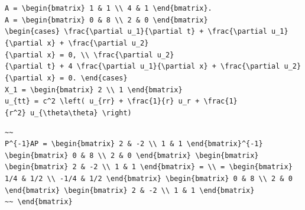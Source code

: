 \documentclass[
  ukrainian,
]{article}
\begin{document}
\texttt{A\ =\ \textbackslash{}begin\{bmatrix\}\ 1\ \&\ 1\ \textbackslash{}\textbackslash{}\ 4\ \&\ 1\ \textbackslash{}end\{bmatrix\}.}
\texttt{A\ =\ \textbackslash{}begin\{bmatrix\}\ 0\ \&\ 8\ \textbackslash{}\textbackslash{}\ 2\ \&\ 0\ \textbackslash{}end\{bmatrix\}}
\texttt{\textbackslash{}begin\{cases\}\ \textbackslash{}frac\{\textbackslash{}partial\ u\_1\}\{\textbackslash{}partial\ t\}\ +\ \textbackslash{}frac\{\textbackslash{}partial\ u\_1\}\{\textbackslash{}partial\ x\}\ +\ \textbackslash{}frac\{\textbackslash{}partial\ u\_2\}\{\textbackslash{}partial\ x\}\ =\ 0,\ \textbackslash{}\textbackslash{}\ \textbackslash{}frac\{\textbackslash{}partial\ u\_2\}\{\textbackslash{}partial\ t\}\ +\ 4\ \textbackslash{}frac\{\textbackslash{}partial\ u\_1\}\{\textbackslash{}partial\ x\}\ +\ \textbackslash{}frac\{\textbackslash{}partial\ u\_2\}\{\textbackslash{}partial\ x\}\ =\ 0.\ \textbackslash{}end\{cases\}}
\texttt{X\_1\ =\ \textbackslash{}begin\{bmatrix\}\ 2\ \textbackslash{}\textbackslash{}\ 1\ \textbackslash{}end\{bmatrix\}}
\texttt{u\_\{tt\}\ =\ c\^{}2\ \textbackslash{}left(\ u\_\{rr\}\ +\ \textbackslash{}frac\{1\}\{r\}\ u\_r\ +\ \textbackslash{}frac\{1\}\{r\^{}2\}\ u\_\{\textbackslash{}theta\textbackslash{}theta\}\ \textbackslash{}right)}

\begin{verbatim}
~~
P^{-1}AP = \begin{bmatrix} 2 & -2 \\ 1 & 1 \end{bmatrix}^{-1} \begin{bmatrix} 0 & 8 \\ 2 & 0 \end{bmatrix} \begin{bmatrix} \begin{bmatrix} 2 & -2 \\ 1 & 1 \end{bmatrix} = \\ = \begin{bmatrix} 1/4 & 1/2 \\ -1/4 & 1/2 \end{bmatrix} \begin{bmatrix} 0 & 8 \\ 2 & 0 \end{bmatrix} \begin{bmatrix} 2 & -2 \\ 1 & 1 \end{bmatrix}
~~ \end{bmatrix}
\end{verbatim}
\end{document}
